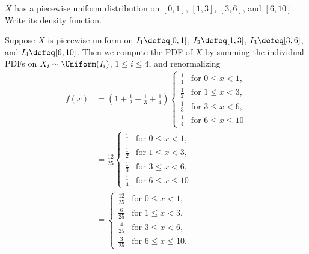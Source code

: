 \begin{problem}[Handout 12, \# 13]
  \(X\) has a piecewise uniform distribution on \([0,1]\), \([1,3]\),
  \([3,6]\), and \([6,10]\). Write its density function.
\end{problem}
\begin{solution}
  Suppose \(X\) is piecewise uniform on \(I_1\defeq[0,1]\),
  \(I_2\defeq[1,3]\), \(I_3\defeq[3,6]\), and \(I_4\defeq[6,10]\). Then we
  compute the PDF of \(X\) by summing the individual PDFs on
  \(X_i\sim\Uniform(I_i)\), \(1\leq i\leq 4\), and renormalizing
  \begin{align*}
    f(x)
    &=\left(1+\frac{1}{2}+\frac{1}{3}+\frac{1}{4}\right)
      \begin{cases}
      \frac{1}{1}&\text{for \(0\leq x<1\)},\\
      \frac{1}{2}&\text{for \(1\leq x<3\),}\\
      \frac{1}{3}&\text{for \(3\leq x<6\),}\\
      \frac{1}{4}&\text{for \(6\leq x\leq 10\)}
      \end{cases}\\
    &=\frac{12}{25}
      \begin{cases}
      \frac{1}{1}&\text{for \(0\leq x<1\)},\\
      \frac{1}{2}&\text{for \(1\leq x<3\),}\\
      \frac{1}{3}&\text{for \(3\leq x<6\),}\\
      \frac{1}{4}&\text{for \(6\leq x\leq 10\)}
      \end{cases}\\
    &=\begin{cases}
      \frac{12}{25}&\text{for \(0\leq x<1\)},\\
      \frac{6}{25}&\text{for \(1\leq x<3\),}\\
      \frac{4}{25}&\text{for \(3\leq x<6\),}\\
      \frac{3}{25}&\text{for \(6\leq x\leq 10\).}
      \end{cases}
  \end{align*}
\end{solution}
\newpage

